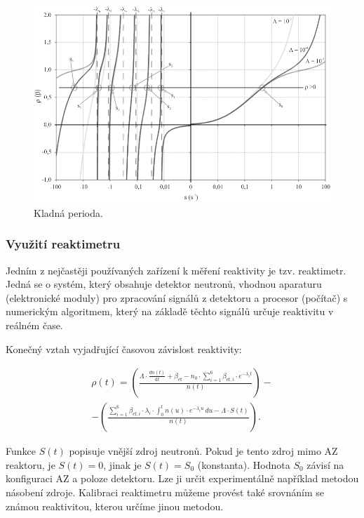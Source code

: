 \begin{figure}[H]
    \centering
    \includegraphics[scale=0.7]{img/KladnáPeriodaKořeny.png}
    \caption{Kladná perioda.}
    \label{fig:KladnáPeriodaKořeny}
\end{figure}

\subsubsection{Využití reaktimetru}

Jedním z nejčastěji používaných zařízení k měření reaktivity je tzv. reaktimetr. Jedná se o systém, který obsahuje detektor neutronů, vhodnou aparaturu (elektronické moduly) pro zpracování signálů z detektoru a procesor (počítač) s numerickým algoritmem, který na základě těchto signálů určuje reaktivitu v reálném čase.

Konečný vztah vyjadřující časovou závislost reaktivity:

\begin{equation}
    \boxed{
  \begin{multlined}
    \rho(t) = \left( \frac{\Lambda \cdot \frac{dn(t)}{\text{d}t} + \beta_{\text{ef}} - n_0 \cdot \sum_{i=1}^6 \beta_{\text{ef}, i} \cdot e^{-\lambda_i t}}{n(t)} \right) -\\
    - \left( \frac{\sum_{i=1}^6 \beta_{\text{ef}, i} \cdot \lambda_i \cdot \int_0^t n(u) \cdot e^{-\lambda_i u} \, du - \Lambda \cdot S(t)}{n(t)} \right).
\end{multlined}}
\end{equation}

Funkce $ S(t) $ popisuje vnější zdroj neutronů. Pokud je tento zdroj mimo AZ reaktoru, je $ S(t) = 0 $, jinak je $ S(t) = S_0 $ (konstanta). Hodnota $ S_0 $ závisí na konfiguraci AZ a poloze detektoru. Lze ji určit experimentálně například metodou násobení zdroje. Kalibraci reaktimetru můžeme provést také srovnáním se známou reaktivitou, kterou určíme jinou metodou.


